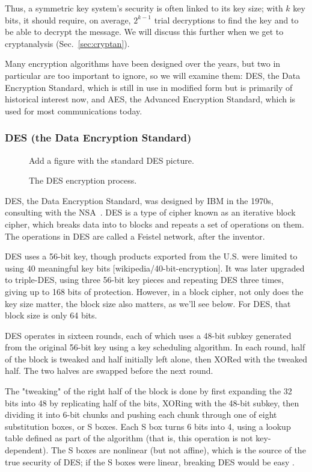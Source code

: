 Thus, a symmetric key system's security is often linked to its key
size; with $k$ key bits, it should require, on average, $2^{k-1}$
trial decryptions to find the key and to be able to decrypt the
message.  We will discuss this further when we get to cryptanalysis (Sec.~\ref{sec:cryptan}).

Many encryption algorithms have been designed over the years, but two
in particular are too important to ignore, so we will examine them:
DES, the Data Encryption Standard, which is still in use in modified
form but is primarily of historical interest now, and AES, the
Advanced Encryption Standard, which is used for most communications
today.

\subsubsection{DES (the Data Encryption Standard)}

\begin{figure}
  {\color{Magenta} Add a figure with the standard DES picture.}
  \caption{The DES encryption process.}
  \label{fig:des}
\end{figure}

DES, the Data Encryption Standard, was designed by IBM in the 1970s,
consulting with the NSA~\cite{standard199946}.  DES is a type of cipher known as an
iterative block cipher, which breaks data into to blocks and repeats a
set of operations on them.  The operations in DES are called a Feistel
network, after the inventor.

DES uses a 56-bit key, though products exported from the U.S. were
limited to using 40 meaningful key bits [wikipedia/40-bit-encryption].
It was later upgraded to triple-DES, using three 56-bit key pieces and
repeating DES three times, giving up to 168 bits of protection.
However, in a block cipher, not only does the key size matter, the
block size also matters, as we'll see below.  For DES, that block size
is only 64 bits.

DES operates in sixteen rounds, each of which uses a 48-bit subkey
generated from the original 56-bit key using a key scheduling
algorithm.  In each round, half of the block is tweaked and half
initially left alone, then XORed with the tweaked half.  The two
halves are swapped before the next round.

The "tweaking" of the right half of the block is done by first
expanding the 32 bits into 48 by replicating half of the bits, XORing
with the 48-bit subkey, then dividing it into 6-bit chunks and pushing
each chunk through one of eight substitution boxes, or S boxes.  Each
S box turns 6 bits into 4, using a lookup table defined as part of the
algorithm (that is, this operation is not key-dependent).  \aonolook{} The S boxes
are nonlinear (but not affine), which is the source of the true
security of DES; if the S boxes were linear, breaking DES would be
easy .

